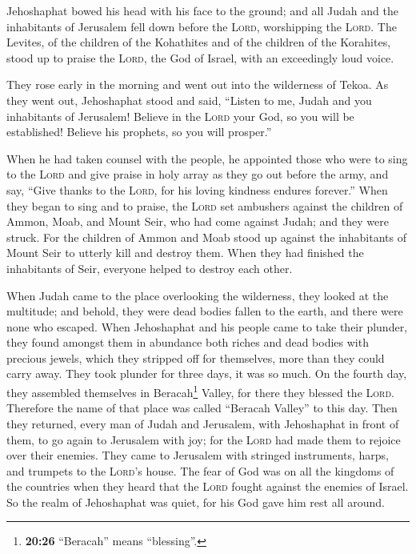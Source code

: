  Jehoshaphat bowed his head with his face to the ground;
and all Judah and the inhabitants of Jerusalem fell down before the
\textsc{Lord}, worshipping the \textsc{Lord}.  The
Levites, of the children of the Kohathites and of the children of the
Korahites, stood up to praise the \textsc{Lord}, the God of Israel, with
an exceedingly loud voice.

 They rose early in the morning and went out into the
wilderness of Tekoa. As they went out, Jehoshaphat stood and said,
``Listen to me, Judah and you inhabitants of Jerusalem! Believe in the
\textsc{Lord} your God, so you will be established! Believe his
prophets, so you will prosper.''

 When he had taken counsel with the people, he appointed
those who were to sing to the \textsc{Lord} and give praise in holy
array as they go out before the army, and say, ``Give thanks to the
\textsc{Lord}, for his loving kindness endures forever.''
 When they began to sing and to praise, the \textsc{Lord}
set ambushers against the children of Ammon, Moab, and Mount Seir, who
had come against Judah; and they were struck.  For the
children of Ammon and Moab stood up against the inhabitants of Mount
Seir to utterly kill and destroy them. When they had finished the
inhabitants of Seir, everyone helped to destroy each other.

 When Judah came to the place overlooking the wilderness,
they looked at the multitude; and behold, they were dead bodies fallen
to the earth, and there were none who escaped.  When
Jehoshaphat and his people came to take their plunder, they found
amongst them in abundance both riches and dead bodies with precious
jewels, which they stripped off for themselves, more than they could
carry away. They took plunder for three days, it was so much.
 On the fourth day, they assembled themselves in
Beracah\footnote{\textbf{20:26} ``Beracah'' means ``blessing''.} Valley,
for there they blessed the \textsc{Lord}. Therefore the name of that
place was called ``Beracah Valley'' to this day.  Then
they returned, every man of Judah and Jerusalem, with Jehoshaphat in
front of them, to go again to Jerusalem with joy; for the \textsc{Lord}
had made them to rejoice over their enemies.  They came
to Jerusalem with stringed instruments, harps, and trumpets to the
\textsc{Lord}'s house.  The fear of God was on all the
kingdoms of the countries when they heard that the \textsc{Lord} fought
against the enemies of Israel.  So the realm of
Jehoshaphat was quiet, for his God gave him rest all around.

